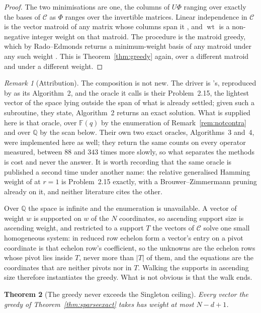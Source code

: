 \documentclass[11pt,reqno]{amsart}
\theoremstyle{plain}
\newtheorem{theorem}{Theorem}[section]
\theoremstyle{definition}
\theoremstyle{remark}
\newtheorem{remark}[theorem]{Remark}
\newcommand{\GF}{\mathbb{F}}
\newcommand{\wt}{\operatorname{wt}}
\begin{document}
\begin{proof}
The two minimisations are one, the columns of $U\Phi$ ranging over exactly the
bases of $\mathcal{C}$ as $\Phi$ ranges over the invertible matrices. Linear
independence in $\mathcal{C}$ is the vector matroid of any matrix whose columns
span it \cite[Prop.~1.1.1]{oxley}, and $\wt$ is a non-negative integer weight on
that matroid. The procedure is the matroid greedy, which by Rado--Edmonds returns
a minimum-weight basis of any matroid under any such weight
\cite[Lem.~1.8.3]{oxley}. This is Theorem~\ref{thm:greedy} again, over a
different matroid and under a different weight.
\end{proof}

\begin{remark}[Attribution]
The composition is not new. The driver is \cite{gottlieb2010}'s, reproduced by
\cite{beniamini2020} as its Algorithm~2, and the oracle it calls is their
Problem~2.15, the lightest vector of the space lying outside the span of what is
already settled; given such a subroutine, they state, Algorithm~2 returns an
exact solution. What is supplied here is that oracle, over $\GF(q)$ by the
enumeration of Remark~\ref{rem:notcontra} and over $\mathbb{Q}$ by the scan
below. Their own two exact oracles, Algorithms~3 and~4, were implemented here as
well; they return the same counts on every operator measured, between $88$ and
$343$ times more slowly, so what separates the methods is cost and never the
answer. It is worth recording that the same oracle is published a second time
under another name: the relative generalised Hamming weight of \cite{sanjose2025}
at $r=1$ is Problem~2.15 exactly, with a Brouwer--Zimmermann pruning already on
it, and neither literature cites the other.
\end{remark}

Over $\mathbb{Q}$ the space is infinite and the enumeration is unavailable. A
vector of weight $w$ is supported on $w$ of the $N$ coordinates, so ascending
support size is ascending weight, and restricted to a support $T$ the vectors of
$\mathcal{C}$ solve one small homogeneous system: in reduced row echelon form a
vector's entry on a pivot coordinate is that echelon row's coefficient, so the
unknowns are the echelon rows whose pivot lies inside $T$, never more than $|T|$
of them, and the equations are the coordinates that are neither pivots nor in
$T$. Walking the supports in ascending size therefore instantiates the greedy.
What is not obvious is that the walk ends.

\begin{theorem}[The greedy never exceeds the Singleton ceiling]\label{thm:sparseceiling}
Every vector the greedy of Theorem~\ref{thm:sparseexact} takes has weight at most
$N-d+1$.
\end{theorem}
\end{document}
